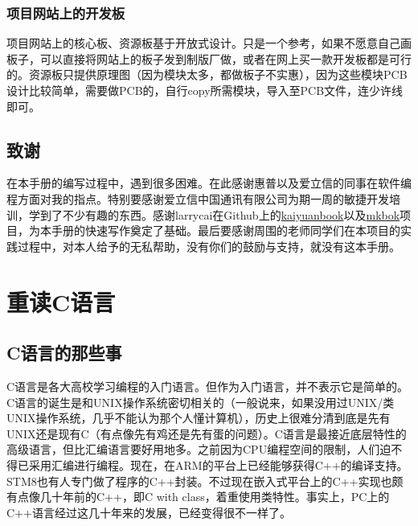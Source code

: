\documentclass[a4paper]{book}
\makeatletter
\let\savedtitle=\@title
\renewcommand{\headrulewidth}{0pt}
\newcounter{tab}[chapter]
\newcommand{\chap}[1]{\newpage\thispagestyle{empty}\chapter{#1}\label{chap:\thechapter}}
\makeatother
\begin{document}
\subsection*{项目网站上的开发板}

项目网站上的核心板、资源板基于开放式设计。只是一个参考，如果不愿意自己画板子，可以直接将网站上的板子发到制版厂做，或者在网上买一款开发板都是可行的。资源板只提供原理图（因为模块太多，都做板子不实惠），因为这些模块PCB设计比较简单，需要做PCB的，自行copy所需模块，导入至PCB文件，连少许线即可。

\section*{致谢}

在本手册的编写过程中，遇到很多困难。在此感谢惠普以及爱立信的同事在软件编程方面对我的指点。特别要感谢爱立信中国通讯有限公司为期一周的敏捷开发培训，学到了不少有趣的东西。感谢larrycai在Github上的\href{www.github.com/larrycai/kaiyuanbook}{kaiyuanbook}以及\href{www.github.com/larrycai/mkbok}{mkbok}项目，为本手册的快速写作奠定了基础。最后要感谢周围的老师同学们在本项目的实践过程中，对本人给予的无私帮助，没有你们的鼓励与支持，就没有这本手册。

\tableofcontents\newpage\thispagestyle{empty}


\fancyhf{}
\fancyhead[LE]{\color{colorheader}\quad\small\textbf\thepage\quad\quad\small\leftmark}
\fancyhead[RO]{\color{colorheader}\small\rightmark\quad\quad\small\textbf\thepage\quad}

\pagestyle{fancy}

\mainmatter
\chap{重读C语言}

\section{C语言的那些事}

C语言是各大高校学习编程的入门语言。但作为入门语言，并不表示它是简单的。C语言的诞生是和UNIX操作系统密切相关的（一般说来，如果没用过UNIX/类UNIX操作系统，几乎不能认为那个人懂计算机），历史上很难分清到底是先有UNIX还是现有C（有点像先有鸡还是先有蛋的问题）。C语言是最接近底层特性的高级语言，但比汇编语言要好用地多。之前因为CPU编程空间的限制，人们迫不得已采用汇编进行编程。现在，在ARM的平台上已经能够获得C++的编译支持。STM8也有人专门做了程序的C++封装。不过现在嵌入式平台上的C++实现也颇有点像几十年前的C++，即C with class，着重使用类特性。事实上，PC上的C++语言经过这几十年来的发展，已经变得很不一样了。
\end{document}

